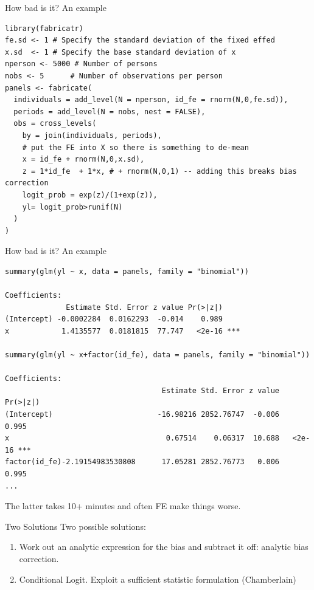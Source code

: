 \documentclass[xcolor=pdftex,dvipsnames,table,mathserif,aspectratio=169]{beamer}
\begin{document}
\begin{frame}[fragile]{How bad is it? An example}
\scriptsize
\begin{verbatim}
library(fabricatr)
fe.sd <- 1 # Specify the standard deviation of the fixed effed
x.sd  <- 1 # Specify the base standard deviation of x
nperson <- 5000 # Number of persons
nobs <- 5      # Number of observations per person
panels <- fabricate(
  individuals = add_level(N = nperson, id_fe = rnorm(N,0,fe.sd)),
  periods = add_level(N = nobs, nest = FALSE),
  obs = cross_levels(
    by = join(individuals, periods),
    # put the FE into X so there is something to de-mean
    x = id_fe + rnorm(N,0,x.sd),
    z = 1*id_fe  + 1*x, # + rnorm(N,0,1) -- adding this breaks bias correction
    logit_prob = exp(z)/(1+exp(z)),
    yl= logit_prob>runif(N)
  )
)
\end{verbatim}
\end{frame}


\begin{frame}[fragile]{How bad is it? An example}
\scriptsize
\begin{verbatim}
summary(glm(yl ~ x, data = panels, family = "binomial"))

Coefficients:
              Estimate Std. Error z value Pr(>|z|)    
(Intercept) -0.0002284  0.0162293  -0.014    0.989    
x            1.4135577  0.0181815  77.747   <2e-16 ***

summary(glm(yl ~ x+factor(id_fe), data = panels, family = "binomial"))

Coefficients:
                                    Estimate Std. Error z value Pr(>|z|)    
(Intercept)                        -16.98216 2852.76747  -0.006    0.995    
x                                    0.67514    0.06317  10.688   <2e-16 ***
factor(id_fe)-2.19154983530808      17.05281 2852.76773   0.006    0.995 
...
\end{verbatim}
The latter takes 10+ minutes and often FE make things worse.
\end{frame}

\begin{frame}{Two Solutions}
Two possible solutions:
\begin{enumerate}
\item Work out an analytic expression for the bias and subtract it off: \alert{analytic bias correction}.
\item Conditional Logit. Exploit a \alert{sufficient statistic} formulation (Chamberlain)
\end{enumerate}
\end{frame}
\end{document}
